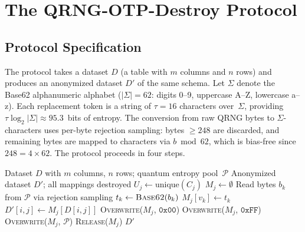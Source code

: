 \documentclass[acmsmall,screen,review,anonymous]{acmart}
\begin{document}
\section{The QRNG-OTP-Destroy Protocol}
\label{sec:protocol}

\subsection{Protocol Specification}
\label{subsec:spec}

The protocol takes a dataset $D$ (a table with $m$ columns and $n$ rows) and produces an anonymized dataset $D'$ of the same schema. Let $\Sigma$ denote the Base62 alphanumeric alphabet ($|\Sigma| = 62$: digits 0--9, uppercase A--Z, lowercase a--z). Each replacement token is a string of $\tau = 16$ characters over~$\Sigma$, providing $\tau \log_2 |\Sigma| \approx 95.3$~bits of entropy. The conversion from raw QRNG bytes to $\Sigma$-characters uses per-byte rejection sampling: bytes $\geq 248$ are discarded, and remaining bytes are mapped to characters via $b \bmod 62$, which is bias-free since $248 = 4 \times 62$. The protocol proceeds in four steps.

\begin{algorithm}[t]
\caption{QRNG-OTP-Destroy}
\label{alg:qrng_otp}
\begin{algorithmic}[1]
\REQUIRE Dataset $D$ with $m$ columns, $n$ rows; quantum entropy pool~$\mathcal{P}$
\ENSURE Anonymized dataset $D'$; all mappings destroyed
    \STATE $U_j \leftarrow \text{unique}(C_j)$ 
    \STATE $M_j \leftarrow \emptyset$ 
        \STATE Read bytes $b_k$ from $\mathcal{P}$ via rejection sampling 
        \STATE $t_k \leftarrow \textsc{Base62}(b_k)$ 
        \STATE $M_j[v_k] \leftarrow t_k$
    \ENDFOR
        \STATE $D'[i,j] \leftarrow M_j[D[i,j]]$
    \ENDFOR
\ENDFOR
{}
    \STATE \textsc{Overwrite}($M_j$, $\texttt{0x00}$) 
    \STATE \textsc{Overwrite}($M_j$, $\texttt{0xFF}$) 
    \STATE \textsc{Overwrite}($M_j$, $\mathcal{P}$) 
    \STATE \textsc{Release}($M_j$)
\ENDFOR
\RETURN $D'$
\end{algorithmic}
\end{algorithm}
\end{document}
